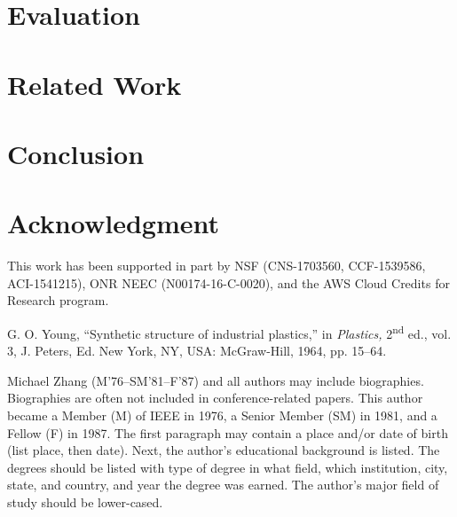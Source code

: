 \documentclass{ieeeaccess}
\begin{document}
\section{Evaluation}
\label{sec:eval}


\section{Related Work}
\label{sec:relate_work}



\section{Conclusion}
\label{sec:conclusion}


\section*{Acknowledgment}
This work has been supported in part by NSF (CNS-1703560, CCF-1539586,
ACI-1541215), ONR NEEC (N00174-16-C-0020),
and the AWS Cloud Credits for Research program.

\begin{thebibliography}{00}

 G. O. Young, ``Synthetic structure of industrial plastics,'' in \emph{Plastics,} 2\textsuperscript{nd} ed., vol. 3, J. Peters, Ed. New York, NY, USA: McGraw-Hill, 1964, pp. 15--64.
\end{thebibliography}


\begin{IEEEbiography}{Michael Zhang} (M'76--SM'81--F'87) and all authors may include 
biographies. Biographies are often not included in conference-related
papers. This author became a Member (M) of IEEE in 1976, a Senior
Member (SM) in 1981, and a Fellow (F) in 1987. The first paragraph may
contain a place and/or date of birth (list place, then date). Next,
the author's educational background is listed. The degrees should be
listed with type of degree in what field, which institution, city,
state, and country, and year the degree was earned. The author's major
field of study should be lower-cased. 


\end{IEEEbiography}
\end{document}
